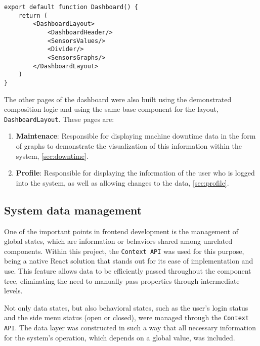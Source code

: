 \begin{verbatim}
export default function Dashboard() {
    return (
        <DashboardLayout>
            <DashboardHeader/>
            <SensorsValues/>
            <Divider/>
            <SensorsGraphs/>
        </DashboardLayout>
    )
}
\end{verbatim}

The other pages of the dashboard were also built using the demonstrated composition logic and using the same base component for the layout, \texttt{DashboardLayout}. These pages are:
\begin{enumerate}
    \item \textbf{Maintenace}: Responsible for displaying machine downtime data in the form of graphs to demonstrate the visualization of this information within the system, \ref{sec:downtime}.
    \item \textbf{Profile}: Responsible for displaying the information of the user who is logged into the system, as well as allowing changes to the data, \ref{sec:profile}.
\end{enumerate}


\subsection{System data management}\label{subsec:contextApi}
One of the important points in frontend development is the management of global states, which are information or behaviors shared among unrelated components. Within this project, the \texttt{Context API} \cite{reactCreateContext} was used for this purpose, being a native React solution that stands out for its ease of implementation and use. This feature allows data to be efficiently passed throughout the component tree, eliminating the need to manually pass properties through intermediate levels.

Not only data states, but also behavioral states, such as the user's login status and the side menu status (open or closed), were managed through the \texttt{Context API}. The data layer was constructed in such a way that all necessary information for the system's operation, which depends on a global value, was included.

